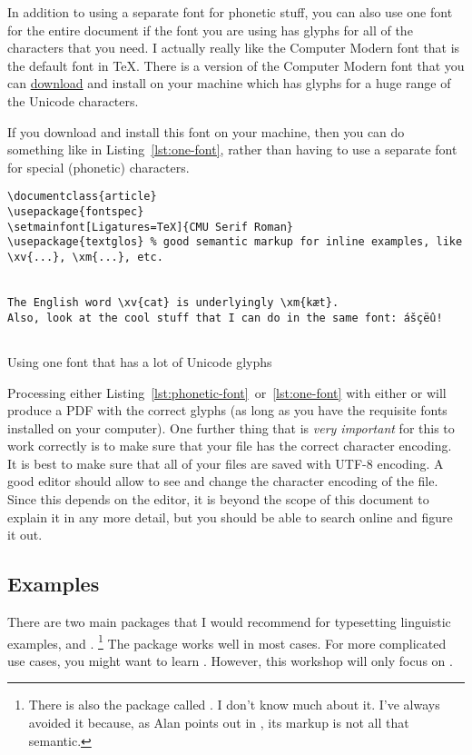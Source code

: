 In addition to using a separate font for phonetic stuff, you can also use one font for the entire document if the font you are using has glyphs for all of the characters that you need.
I actually really like the Computer Modern font that is the default font in \TeX.
There is a version of the Computer Modern font that you can \href{http://sourceforge.net/projects/cm-unicode/}{download} and install on your machine which has glyphs for a huge range of the Unicode characters.

If you download and install this font on your machine, then you can do something like in Listing~\ref{lst:one-font}, rather than having to use a separate font for special (phonetic) characters.

\begin{listing}[htbp]
	\centering
	\begin{verbatim}
\documentclass{article}
\usepackage{fontspec}
\setmainfont[Ligatures=TeX]{CMU Serif Roman}
\usepackage{textglos} % good semantic markup for inline examples, like \xv{...}, \xm{...}, etc.


The English word \xv{cat} is underlyingly \xm{kæt}.
Also, look at the cool stuff that I can do in the same font: ášçëû!


	\end{verbatim}
	\caption{Using one font that has a lot of Unicode glyphs}
	\label{lst:one-font}
\end{listing}

Processing either Listing~\ref{lst:phonetic-font}~or~\ref{lst:one-font} with either  or  will produce a PDF with the correct glyphs (as long as you have the requisite fonts installed on your computer).
One further thing that is \emph{very important} for this to work correctly is to make sure that your  file has the correct character encoding.
It is best to make sure that all of your  files are saved with UTF-8 encoding.
A good editor should allow to see and change the character encoding of the file.
Since this depends on the editor, it is beyond the scope of this document to explain it in any more detail, but you should be able to search online and figure it out.

\subsection{Examples}
\label{subsec:examples}

There are two main packages that I would recommend for typesetting linguistic examples,  and .%
\footnote{%
There is also the package called .
I don't know much about it.
I've always avoided it because, as Alan points out in , its markup is not all that semantic.%
}
The  package works well in most cases.
For more complicated use cases, you might want to learn .
However, this workshop will only focus on .

